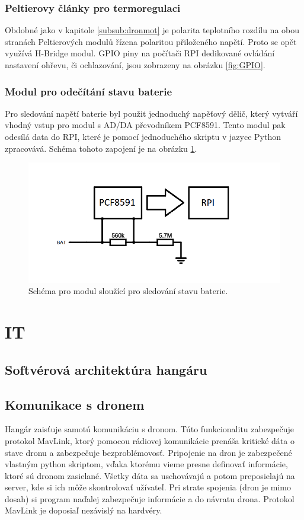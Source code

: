 \documentclass[a4paper]{article}
\begin{document}
        
    \subsubsection{Peltierovy články pro termoregulaci}
    \label{subsub:pelt}
        Obdobné jako v kapitole \ref{subsub:dronmot} je polarita teplotního rozdílu na obou stranách Peltierových modulů řízena polaritou přiloženého napětí. Proto se opět využívá H-Bridge modul. GPIO piny na počítači \acs{RPI} dedikované ovládání nastavení ohřevu, či ochlazování, jsou zobrazeny na obrázku \ref{fig:GPIO}.
    
    \subsubsection{Modul pro odečítání stavu baterie}
    \label{subsub:bat}
        Pro sledování napětí baterie byl použit jednoduchý napěťový dělič, který vytváří vhodný vstup pro modul s AD/DA převodníkem PCF8591. Tento modul pak odesílá data do \acs{RPI}, které je pomocí jednoduchého skriptu v jazyce Python zpracovává. Schéma tohoto zapojení je na obrázku \ref{fig:bat_readout}.

        \begin{figure}[h!]
            \centering
            \includegraphics[width=0.75\linewidth]{schematics/BATcircuit-20241208-1501.png}
            \caption{Schéma pro modul sloužící pro sledování stavu baterie.}
            \label{fig:bat_readout}
        \end{figure}
        
\section{IT}  \label{sec:IT}
    \subsection{Softvérová architektúra hangáru}
    
    \subsection{Komunikace s dronem}
		Hangár zaisťuje samotú komunikáciu s dronom. Túto funkcionalitu zabezpečuje protokol MavLink, ktorý pomocou rádiovej komunikácie prenáša kritické dáta o stave dronu a zabezpečuje bezproblémovosť. Pripojenie na dron je zabezpečené vlastným python skriptom, vďaka ktorému vieme presne definovať informácie, ktoré sú dronom zasielané. Všetky dáta sa uschovávajú a potom preposielajú na server, kde si ich môže skontrolovať užívateľ. Pri strate spojenia (dron je mimo dosah) si program naďalej zabezpečuje informácie a do návratu drona. Protokol MavLink je doposiaľ nezávislý na hardvéry.    
    
\end{document}
